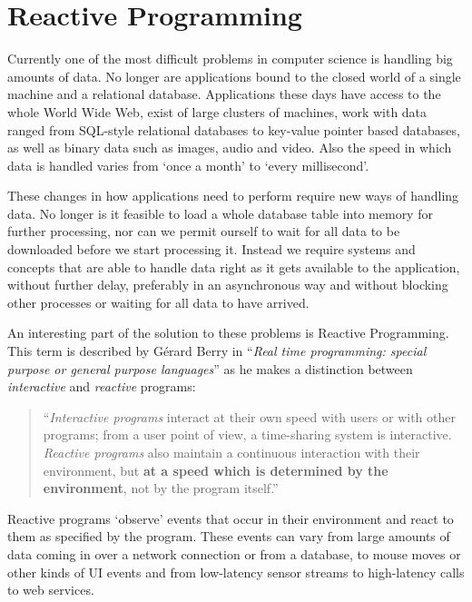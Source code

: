 \section{Reactive Programming}
\label{sec:reactive-programming}
Currently one of the most difficult problems in computer science is handling big amounts of data. No longer are applications bound to the closed world of a single machine and a relational database. Applications these days have access to the whole World Wide Web, exist of large clusters of machines, work with data ranged from SQL-style relational databases to key-value pointer based databases, as well as binary data such as images, audio and video. Also the speed in which data is handled varies from `once a month' to `every millisecond'.

These changes in how applications need to perform require new ways of handling data. No longer is it feasible to load a whole database table into memory for further processing, nor can we permit ourself to wait for all data to be downloaded before we start processing it. Instead we require systems and concepts that are able to handle data right as it gets available to the application, without further delay, preferably in an asynchronous way and without blocking other processes or waiting for all data to have arrived. \cite{meijer2012-YMIAD}

An interesting part of the solution to these problems is Reactive Programming. This term is described by G\'erard Berry in ``\textit{Real time programming: special purpose or general purpose languages}'' \cite{berry1989-Reactive} as he makes a distinction between \textit{interactive} and \textit{reactive} programs:

\begin{quote}
``\textit{Interactive programs} interact at their own speed with users or with other programs; from a user point of view, a time-sharing system is interactive. \textit{Reactive programs} also maintain a continuous interaction with their environment, but \textbf{at a speed which is determined by the environment}, not by the program itself.''
\end{quote}

Reactive programs `observe' events that occur in their environment and react to them as specified by the program. These events can vary from large amounts of data coming in over a network connection or from a database, to mouse moves or other kinds of UI events and from low-latency sensor streams to high-latency calls to web services.

